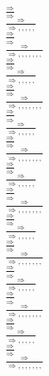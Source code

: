 \documentclass[11pt]{article}
\begin{document}
\begin{center}
\\$\frac{\Rightarrow }{\Rightarrow }$
\bigskip
\\$\frac{\Rightarrow }{\Rightarrow , , , , , }$
\bigskip
\\$\frac{\Rightarrow }{\Rightarrow }$
\bigskip
\\$\frac{\Rightarrow }{\Rightarrow , , , , , , , }$
\bigskip
\\$\frac{\Rightarrow }{\Rightarrow }$
\bigskip
\\$\frac{\Rightarrow }{\Rightarrow , , , , , }$
\bigskip
\\$\frac{\Rightarrow }{\Rightarrow }$
\bigskip
\\$\frac{\Rightarrow }{\Rightarrow , , , , , , , }$
\bigskip
\\$\frac{\Rightarrow }{\Rightarrow }$
\bigskip
\\$\frac{\Rightarrow }{\Rightarrow , , , , , }$
\bigskip
\\$\frac{\Rightarrow }{\Rightarrow }$
\bigskip
\\$\frac{\Rightarrow }{\Rightarrow , , , , , , , }$
\bigskip
\\$\frac{\Rightarrow }{\Rightarrow }$
\bigskip
\\$\frac{\Rightarrow }{\Rightarrow , , , , , }$
\bigskip
\\$\frac{\Rightarrow }{\Rightarrow }$
\bigskip
\\$\frac{\Rightarrow }{\Rightarrow , , , , , , , }$
\bigskip
\\$\frac{\Rightarrow }{\Rightarrow }$
\bigskip
\\$\frac{\Rightarrow }{\Rightarrow , , , , , }$
\bigskip
\\$\frac{\Rightarrow }{\Rightarrow }$
\bigskip
\\$\frac{\Rightarrow }{\Rightarrow , , , , , , , }$
\bigskip
\\$\frac{\Rightarrow }{\Rightarrow }$
\bigskip
\\$\frac{\Rightarrow }{\Rightarrow , , , , , }$
\bigskip
\\$\frac{\Rightarrow }{\Rightarrow }$
\bigskip
\\$\frac{\Rightarrow }{\Rightarrow , , , , , , , }$
\bigskip
\\$\frac{\Rightarrow }{\Rightarrow }$
\bigskip
\\$\frac{\Rightarrow }{\Rightarrow , , , , , }$
\bigskip
\\$\frac{\Rightarrow }{\Rightarrow }$
\bigskip
\\$\frac{\Rightarrow }{\Rightarrow , , , , , , , }$
\bigskip

\end{center}
\end{document}
